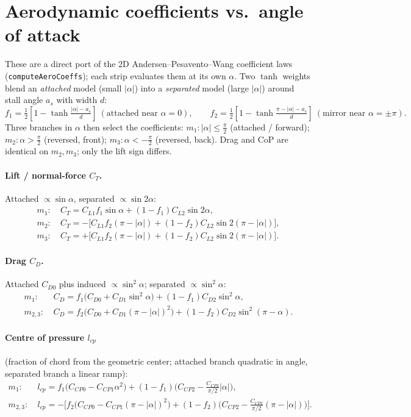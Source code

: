 \documentclass[11pt]{article}
\begin{document}
\section*{Aerodynamic coefficients vs.\ angle of attack}
These are a direct port of the 2D Andersen--Pesavento--Wang coefficient laws
(\texttt{computeAeroCoeffs}); each strip evaluates them at its own $\alpha$. Two
$\tanh$ weights blend an \emph{attached} model (small $|\alpha|$) into a
\emph{separated} model (large $|\alpha|$) around stall angle $a_s$ with width $d$:
\[
  f_1 = \tfrac12\!\left[1-\tanh\!\tfrac{|\alpha|-a_s}{d}\right]\ (\text{attached near }\alpha{=}0),
  \qquad
  f_2 = \tfrac12\!\left[1-\tanh\!\tfrac{\pi-|\alpha|-a_s}{d}\right]\ (\text{mirror near }\alpha{=}\pm\pi).
\]
Three branches in $\alpha$ then select the coefficients: $m_1:|\alpha|\le\tfrac\pi2$
(attached / forward); $m_2:\alpha>\tfrac\pi2$ (reversed, front); $m_3:\alpha<-\tfrac\pi2$
(reversed, back). Drag and CoP are identical on $m_2,m_3$; only the lift sign differs.

\paragraph{Lift / normal-force $C_T$.} Attached $\propto\sin\alpha$, separated $\propto\sin2\alpha$:
\begin{align*}
  m_1:\ & C_T = C_{L1}f_1\sin\alpha + (1{-}f_1)C_{L2}\sin2\alpha,\\
  m_2:\ & C_T = -\big[C_{L1}f_2(\pi{-}|\alpha|) + (1{-}f_2)C_{L2}\sin2(\pi{-}|\alpha|)\big],\\
  m_3:\ & C_T = +\big[C_{L1}f_2(\pi{-}|\alpha|) + (1{-}f_2)C_{L2}\sin2(\pi{-}|\alpha|)\big].
\end{align*}

\paragraph{Drag $C_D$.} Attached $C_{D0}$ plus induced $\propto\sin^2\alpha$; separated $\propto\sin^2\alpha$:
\begin{align*}
  m_1:\ & C_D = f_1\big(C_{D0}+C_{D1}\sin^2\alpha\big) + (1{-}f_1)C_{D2}\sin^2\alpha,\\
  m_{2,3}:\ & C_D = f_2\big(C_{D0}+C_{D1}(\pi{-}|\alpha|)^2\big) + (1{-}f_2)C_{D2}\sin^2(\pi{-}\alpha).
\end{align*}

\paragraph{Centre of pressure $l_{cp}$} (fraction of chord from the geometric center;
attached branch quadratic in angle, separated branch a linear ramp):
\begin{align*}
  m_1:\ & l_{cp} = f_1\big(C_{CP0}-C_{CP1}\alpha^2\big) + (1{-}f_1)\big(C_{CP2}-\tfrac{C_{CP2}}{\pi/2}|\alpha|\big),\\
  m_{2,3}:\ & l_{cp} = -\Big[f_2\big(C_{CP0}-C_{CP1}(\pi{-}|\alpha|)^2\big) + (1{-}f_2)\big(C_{CP2}-\tfrac{C_{CP2}}{\pi/2}(\pi{-}|\alpha|)\big)\Big].
\end{align*}
\end{document}

